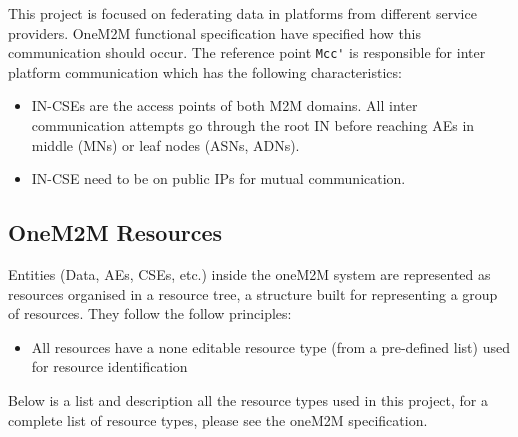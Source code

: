 This project is focused on federating data in platforms from  different service providers. OneM2M functional specification \cite{oneM2M2016OneM2MArchitecture} have specified how this communication should occur. The reference point \lstinline{Mcc'} is responsible for inter platform communication which has the following characteristics:\\ 

\begin{itemize}
  \item IN-CSEs are the access points of both M2M domains. All inter communication  attempts go through the root IN before reaching AEs in middle (MNs) or leaf nodes (ASNs, ADNs). 
  \item IN-CSE need to be on public IPs for mutual communication.
\end{itemize}


\subsection{OneM2M Resources}

Entities (Data, AEs, CSEs, etc.) inside the oneM2M system are represented as resources organised in a resource tree, a structure built for representing a group of resources. They follow the follow principles:

\begin{itemize}
	\item All resources have a none editable resource type (from a pre-defined list) used for resource identification
\end{itemize}

Below is a list and description all the resource types used in this project, for a complete list of resource types, please see the oneM2M specification. 

